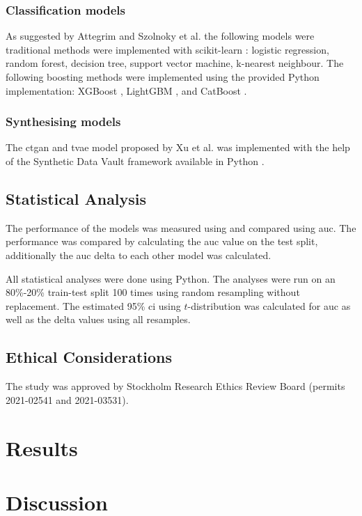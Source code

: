 \documentclass[12pt, letterpaper]{article}
\begin{document}
\subsubsection*{Classification models}
As suggested by Attegrim and Szolnoky et al. the following models were traditional methods were implemented with scikit-learn \cite{pedregosa_scikit_2011}: logistic regression, random forest, decision tree, support vector machine, k-nearest neighbour. The following boosting methods were implemented using the provided Python implementation: XGBoost \cite{chen_xgboost_2016}, LightGBM \cite{ke_lightgbm_2017}, and CatBoost \cite{prokhorenkova_catboost_2018}.

\subsubsection*{Synthesising models}
The \acrfull{ctgan} and \acrfull{tvae} model proposed by Xu et al. was implemented with the help of the Synthetic Data Vault framework available in Python \cite{xu_advances_2019, patki_sdv_2016}.

\subsection{Statistical Analysis}
The performance of the models was measured using and compared using \acrfull{auc}. The performance was compared by calculating the \acrshort{auc} value on the test split, additionally the \acrshort{auc} delta to each other model was calculated.

All statistical analyses were done using Python. The analyses were run on an 80\%-20\% train-test split 100 times using random resampling without replacement. The estimated 95\% \acrfull{ci} using $t$-distribution was calculated for \acrshort{auc} as well as the delta values using all resamples.

\subsection{Ethical Considerations}
The study was approved by Stockholm Research Ethics Review Board (permits 2021-02541 and 2021-03531).

\section{Results}

\section{Discussion}
\end{document}

